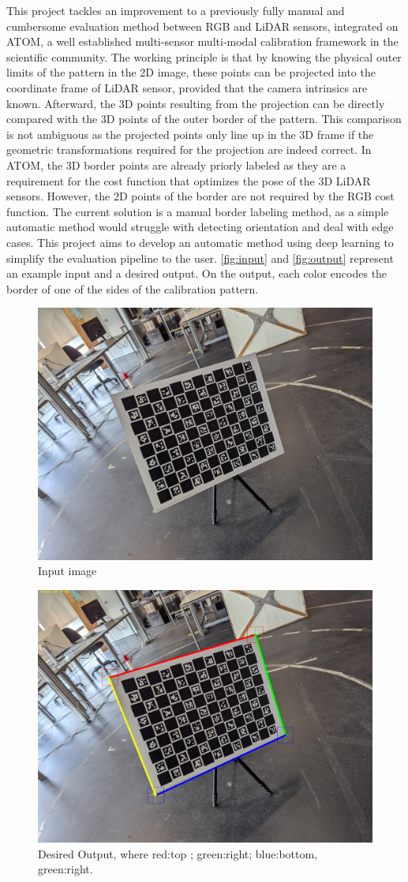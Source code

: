 This project tackles an improvement to a previously fully manual and cumbersome evaluation method between RGB and LiDAR sensors,
integrated on ATOM, a well established multi-sensor multi-modal calibration framework in the
scientific community. The working principle is that by knowing the
physical outer limits of the pattern in the 2D image, these points can be projected into the coordinate frame of LiDAR sensor, provided
that the camera intrinsics are known. Afterward, the 3D points resulting from the projection can be directly compared with the 3D
points of the outer border of the pattern. This comparison is not ambiguous as the projected points only line up in the 3D frame if the
geometric transformations required for the projection are indeed correct. In ATOM, the 3D border points are already priorly labeled as
they are a requirement for the cost function that optimizes the pose of the 3D LiDAR sensors. However, the 2D points of the border are not
required by the RGB cost function. The current solution is a manual border labeling method, as a
simple automatic method would struggle with detecting orientation and deal with edge cases. This
project aims to develop an automatic method using deep learning to simplify the evaluation pipeline to the user. \autoref{fig:input}
and \autoref{fig:output} represent an example input and a desired output. On the output, each color encodes the border of one of the
sides of the calibration pattern.

\begin{figure}[h]
    \centering
    \includegraphics[width=0.8\linewidth]{resources/images/pattern_28.jpg}
    \caption{Input image}
    \label{fig:input}
\end{figure}

\begin{figure}[h]
    \centering
    \includegraphics[width=0.8\linewidth]{resources/images/pattern_28_lines.png}
    \caption{Desired Output, where red:top ; green:right; blue:bottom, green:right.}
    \label{fig:output}
\end{figure}
